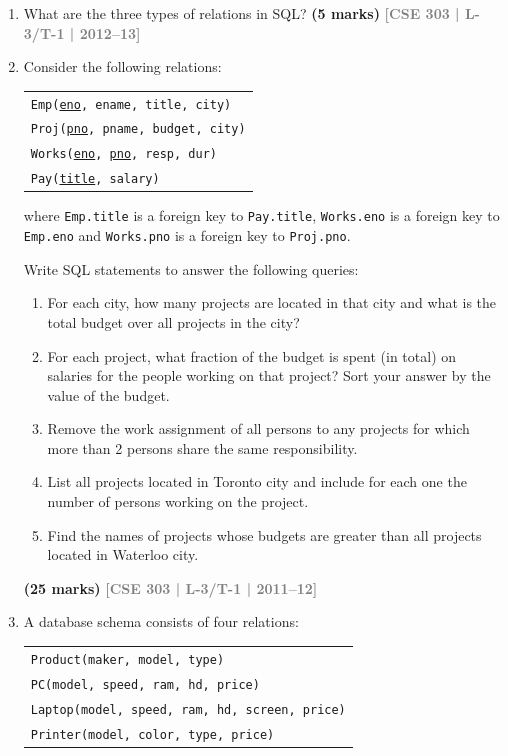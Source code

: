 \documentclass[12pt]{article}
\newcommand{\yr}[1]{\hfill\textcolor{gray}{\small\textbf{[#1]}}}
\newcommand{\mk}[1]{\textcolor{orange!70!black}{\small\textbf{(#1 marks)}}}
\begin{document}
\begin{enumerate}
\item What are the three types of relations in SQL?
\mk{5} \yr{CSE 303 | L-3/T-1 | 2012--13}


\item Consider the following relations:
\begin{center}
\begin{tabular}{l}
\texttt{Emp(\underline{eno}, ename, title, city)}\\
\texttt{Proj(\underline{pno}, pname, budget, city)}\\
\texttt{Works(\underline{eno}, \underline{pno}, resp, dur)}\\
\texttt{Pay(\underline{title}, salary)}
\end{tabular}
\end{center}
where \texttt{Emp.title} is a foreign key to \texttt{Pay.title}, \texttt{Works.eno} is a foreign key to \texttt{Emp.eno} and \texttt{Works.pno} is a foreign key to \texttt{Proj.pno}.

Write SQL statements to answer the following queries:
\begin{enumerate}
  \item For each city, how many projects are located in that city and what is the total budget over all projects in the city?
  \item For each project, what fraction of the budget is spent (in total) on salaries for the people working on that project? Sort your answer by the value of the budget.
  \item Remove the work assignment of all persons to any projects for which more than 2 persons share the same responsibility.
  \item List all projects located in Toronto city and include for each one the number of persons working on the project.
  \item Find the names of projects whose budgets are greater than all projects located in Waterloo city.
\end{enumerate}
\mk{25} \yr{CSE 303 | L-3/T-1 | 2011--12}


\item A database schema consists of four relations:
\begin{center}
\begin{tabular}{l}
\texttt{Product(maker, model, type)}\\
\texttt{PC(model, speed, ram, hd, price)}\\
\texttt{Laptop(model, speed, ram, hd, screen, price)}\\
\texttt{Printer(model, color, type, price)}
\end{tabular}
\end{center}


\end{enumerate}
\end{document}

